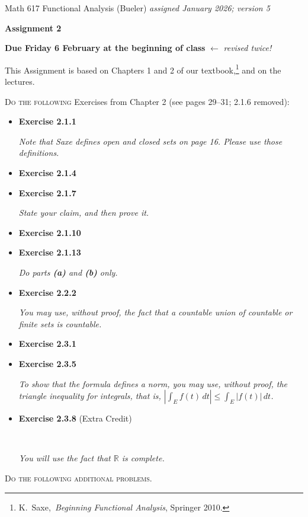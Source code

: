 \documentclass[12pt]{amsart}
\newcommand{\RR}{\mathbb{R}}
\begin{document}
\scriptsize \noindent Math 617 Functional Analysis (Bueler) \hfill \emph{assigned January 2026; {\color{BrickRed} version 5}}
\normalsize\medskip

\Large\centerline{\textbf{Assignment 2}}
\large
\medskip

\centerline{\textbf{Due Friday 6 February at the beginning of class} {\color{BrickRed} $\longleftarrow$ \emph{revised twice!}}}
\medskip
\normalsize

\thispagestyle{empty}

\bigskip
\noindent This Assignment is based on Chapters 1 and 2 of our textbook,\footnote{K.~Saxe,~\emph{Beginning Functional Analysis}, Springer 2010.} and on the lectures.


\newcommand{\augment}[1]{\quad\,\strut \begin{minipage}[t]{0.7\textwidth} \emph{#1}\end{minipage}}

\bigskip
\noindent \textsc{Do the following} Exercises from Chapter 2 (see pages 29--31; {\color{BrickRed} 2.1.6 removed}):

\begin{itemize}
\item \textbf{Exercise 2.1.1} \augment{Note that Saxe defines \emph{open} and \emph{closed} sets on page 16.  Please use those definitions.}
\item \textbf{Exercise 2.1.4}
\item \textbf{Exercise 2.1.7} \augment{State your claim, and then prove it.}
\item \textbf{Exercise 2.1.10}
\item \textbf{Exercise 2.1.13} \augment{Do parts \textbf{(a)} and \textbf{(b)} only.}
\item \textbf{Exercise 2.2.2} \augment{You may use, without proof, the fact that a countable union of countable or finite sets is countable.}
\item \textbf{Exercise 2.3.1}
\item \textbf{Exercise 2.3.5} \augment{To show that the formula defines a norm, you may use, without proof, the triangle inequality for integrals, that is, $|\int_E f(t)\,dt| \le \int_E |f(t)|\,dt$.}

\smallskip
\item \textbf{Exercise 2.3.8} {\color{BrickRed} (Extra Credit)}\strut \augment{You will use the fact that $\RR$ is complete.}
\end{itemize}


\medskip
\noindent \textsc{Do the following additional problems.}
\end{document}
